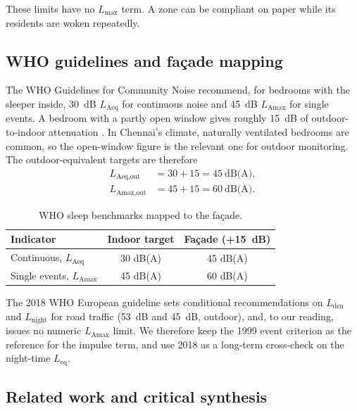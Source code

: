 \documentclass[conference]{IEEEtran}
\newcommand{\Leq}{L_{\text{eq}}}
\newcommand{\Lmax}{L_{\max}}
\begin{document}
These limits have no $\Lmax$ term. A zone can be compliant on paper while its residents are woken repeatedly.

\subsection{WHO guidelines and fa\c{c}ade mapping}

The WHO Guidelines for Community Noise \cite{who1999} recommend, for bedrooms with the sleeper inside, 30~dB $L_{\text{Aeq}}$ for continuous noise and 45~dB $L_{\text{Amax}}$ for single events. A bedroom with a partly open window gives roughly 15~dB of outdoor-to-indoor attenuation \cite{who1999}. In Chennai's climate, naturally ventilated bedrooms are common, so the open-window figure is the relevant one for outdoor monitoring. The outdoor-equivalent targets are therefore
\begin{equation}
\begin{split}
L_{\text{Aeq,out}} &= 30 + 15 = 45~\text{dB(A)},\\
L_{\text{Amax,out}} &= 45 + 15 = 60~\text{dB(A)}.
\end{split}
\label{eq:who}
\end{equation}

\begin{table}[!t]
\caption{WHO sleep benchmarks mapped to the fa\c{c}ade.}
\label{tab:who}
\centering
\small
\renewcommand{\arraystretch}{1.15}
\begin{tabular}{@{}lcc@{}}
\toprule
Indicator & Indoor target & Fa\c{c}ade (+15~dB) \\
\midrule
Continuous, $L_{\text{Aeq}}$ & 30 dB(A) & 45 dB(A) \\
Single events, $L_{\text{Amax}}$ & 45 dB(A) & 60 dB(A) \\
\bottomrule
\end{tabular}
\end{table}

The 2018 WHO European guideline \cite{who2018} sets conditional recommendations on $L_{\text{den}}$ and $L_{\text{night}}$ for road traffic (53~dB and 45~dB, outdoor), and, to our reading, issues no numeric $L_{\text{Amax}}$ limit. We therefore keep the 1999 event criterion as the reference for the impulse term, and use 2018 as a long-term cross-check on the night-time $\Leq$.

\subsection{Related work and critical synthesis}
\end{document}
